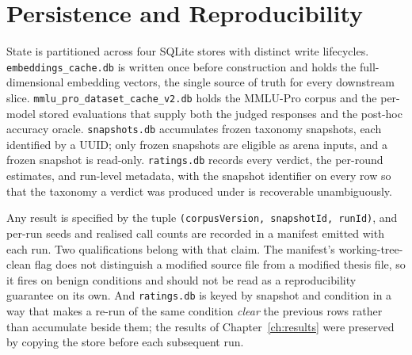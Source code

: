 \section{Persistence and Reproducibility}\label{sec:arch-infra}

State is partitioned across four SQLite stores with distinct write
lifecycles. \texttt{embeddings\_cache.db} is written once before
construction and holds the full-dimensional embedding vectors, the
single source of truth for every downstream slice.
\texttt{mmlu\_pro\_dataset\_cache\_v2.db} holds the MMLU-Pro corpus and
the per-model stored evaluations that supply both the judged responses
and the post-hoc accuracy oracle.
\texttt{snapshots.db} accumulates frozen taxonomy snapshots, each
identified by a UUID; only frozen snapshots are eligible as arena
inputs, and a frozen snapshot is read-only.
\texttt{ratings.db} records every verdict, the per-round estimates, and
run-level metadata, with the snapshot identifier on every row so that
the taxonomy a verdict was produced under is recoverable
unambiguously.

Any result is specified by the tuple
\texttt{(corpusVersion, snapshotId, runId)}, and per-run seeds and
realised call counts are recorded in a manifest emitted with each run.
Two qualifications belong with that claim. The manifest's
working-tree-clean flag does not distinguish a modified source file
from a modified thesis file, so it fires on benign conditions and
should not be read as a reproducibility guarantee on its own. And
\texttt{ratings.db} is keyed by snapshot and condition in a way that
makes a re-run of the same condition \emph{clear} the previous rows
rather than accumulate beside them; the results of
Chapter~\ref{ch:results} were preserved by copying the store before
each subsequent run.
